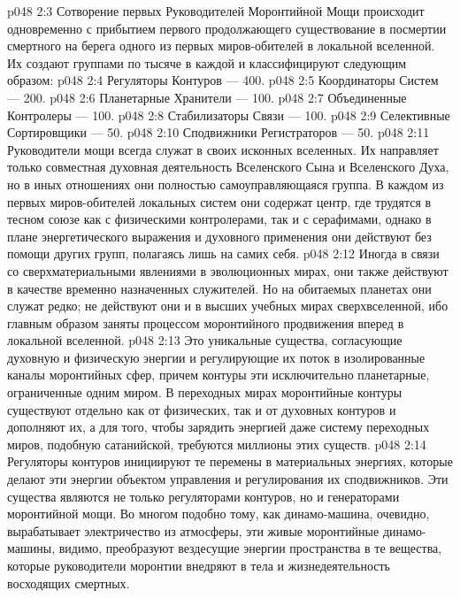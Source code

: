 \vs p048 2:3 Сотворение первых Руководителей Моронтийной Мощи происходит одновременно с прибытием первого продолжающего существование в посмертии смертного на берега одного из первых миров\hyp{}обителей в локальной вселенной. Их создают группами по тысяче в каждой и классифицируют следующим образом:
\vs p048 2:4 \bibnobreakspace Регуляторы Контуров --- 400.
\vs p048 2:5 \bibnobreakspace Координаторы Систем --- 200.
\vs p048 2:6 \bibnobreakspace Планетарные Хранители --- 100.
\vs p048 2:7 \bibnobreakspace Объединенные Контролеры --- 100.
\vs p048 2:8 \bibnobreakspace Стабилизаторы Связи --- 100.
\vs p048 2:9 \bibnobreakspace Селективные Сортировщики --- 50.
\vs p048 2:10 \bibnobreakspace Сподвижники Регистраторов --- 50.
\vs p048 2:11 \pc Руководители мощи всегда служат в своих исконных вселенных. Их направляет только совместная духовная деятельность Вселенского Сына и Вселенского Духа, но в иных отношениях они полностью самоуправляющаяся группа. В каждом из первых миров\hyp{}обителей локальных систем они содержат центр, где трудятся в тесном союзе как с физическими контролерами, так и с серафимами, однако в плане энергетического выражения и духовного применения они действуют без помощи других групп, полагаясь лишь на самих себя.
\vs p048 2:12 Иногда в связи со сверхматериальными явлениями в эволюционных мирах, они также действуют в качестве временно назначенных служителей. Но на обитаемых планетах они служат редко; не действуют они и в высших учебных мирах сверхвселенной, ибо главным образом заняты процессом моронтийного продвижения вперед в локальной вселенной.
\vs p048 2:13 \pc {}\bibnobreakspace {} Это уникальные существа, согласующие духовную и физическую энергии и регулирующие их поток в изолированные каналы моронтийных сфер, причем контуры эти исключительно планетарные, ограниченные одним миром. В переходных мирах моронтийные контуры существуют отдельно как от физических, так и от духовных контуров и дополняют их, а для того, чтобы зарядить энергией даже систему переходных миров, подобную сатанийской, требуются миллионы этих существ.
\vs p048 2:14 Регуляторы контуров инициируют те перемены в материальных энергиях, которые делают эти энергии объектом управления и регулирования их сподвижников. Эти существа являются не только регуляторами контуров, но и генераторами моронтийной мощи. Во многом подобно тому, как динамо\hyp{}машина, очевидно, вырабатывает электричество из атмосферы, эти живые моронтийные динамо\hyp{}машины, видимо, преобразуют вездесущие энергии пространства в те вещества, которые руководители моронтии внедряют в тела и жизнедеятельность восходящих смертных.
